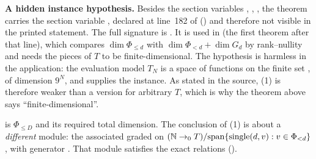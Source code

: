 \begin{dictionary}
\textbf{A hidden instance hypothesis.} Besides the section variables , , , the theorem
 carries the section variable \lean{[FiniteDimensional ℂ T]}, declared at line~182 of
 () and therefore not visible in the printed statement.
The full signature is
. It is used in
 (the first theorem after that  line), which compares $\dim\Phi_{\le d}$ with
$\dim\Phi_{<d}+\dim G_d$ by rank--nullity and needs the pieces of $T$ to be finite-dimensional. The hypothesis is harmless in
the application: the evaluation model $T_N$ is a space of functions on the finite set , of dimension $9^N$, and
 supplies the instance. As stated in the source, (1) is therefore weaker than a version for
arbitrary $T$, which is why the theorem above says ``finite-dimensional''.

 is $\Phi_{\le D}$ and  its required total dimension. The conclusion of (1) is about a
\emph{different} module: the associated graded  on $({\mathbb{N}}\to_0T)/\mathrm{span}\{\text{single}(d,v):v\in\Phi_{<d}\}$,
with generator . That module satisfies the exact relations  ().
\end{dictionary}

